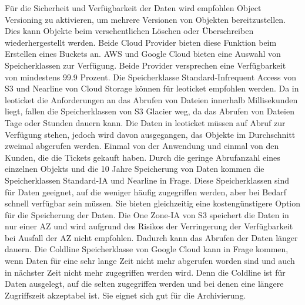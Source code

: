 Für die Sicherheit und Verfügbarkeit der Daten wird empfohlen Object Versioning zu aktivieren, um mehrere Versionen von Objekten bereitzustellen. Dies kann Objekte beim versehentlichen Löschen oder Überschreiben wiederhergestellt werden. Beide Cloud Provider bieten diese Funktion beim Erstellen eines Buckets an. AWS und Google Cloud bieten eine Auswahl von Speicherklassen zur Verfügung. Beide Provider versprechen eine Verfügbarkeit von mindestens 99.9 Prozent. Die Speicherklasse Standard-Infrequent Access von S3 und Nearline von Cloud Storage können für leoticket empfohlen werden. Da in leoticket die Anforderungen an das Abrufen von Dateien innerhalb Millisekunden liegt, fallen die Speicherklassen von S3 Glacier weg, da das Abrufen von Dateien Tage oder Stunden dauern kann. Die Daten in leoticket müssen auf Abruf zur Verfügung stehen, jedoch wird davon ausgegangen, das Objekte im Durchschnitt zweimal abgerufen werden. Einmal von der Anwendung und einmal von den Kunden, die die Tickets gekauft haben. Durch die geringe Abrufanzahl eines einzelnen Objekts und die 10 Jahre Speicherung von Daten kommen die Speicherklassen Standard-IA und Nearline in Frage. Diese Speicherklassen sind für Daten geeignet, auf die weniger häufig zugegriffen werden, aber bei Bedarf schnell verfügbar sein müssen. Sie bieten gleichzeitig eine kostengünstigere Option für die Speicherung der Daten. Die One Zone-IA von S3 speichert die Daten in nur einer AZ und wird aufgrund des Risikos der Verringerung der Verfügbarkeit bei Ausfall der AZ nicht empfohlen. Dadurch kann das Abrufen der Daten länger dauern. Die Coldline Speicherklasse von Google Cloud kann in Frage kommen, wenn Daten für eine sehr lange Zeit nicht mehr abgerufen worden sind und auch in nächster Zeit nicht mehr zugegriffen werden wird. Denn die Coldline ist für Daten ausgelegt, auf die selten zugegriffen werden und bei denen eine längere Zugriffszeit akzeptabel ist.  Sie eignet sich gut für die Archivierung.\\

